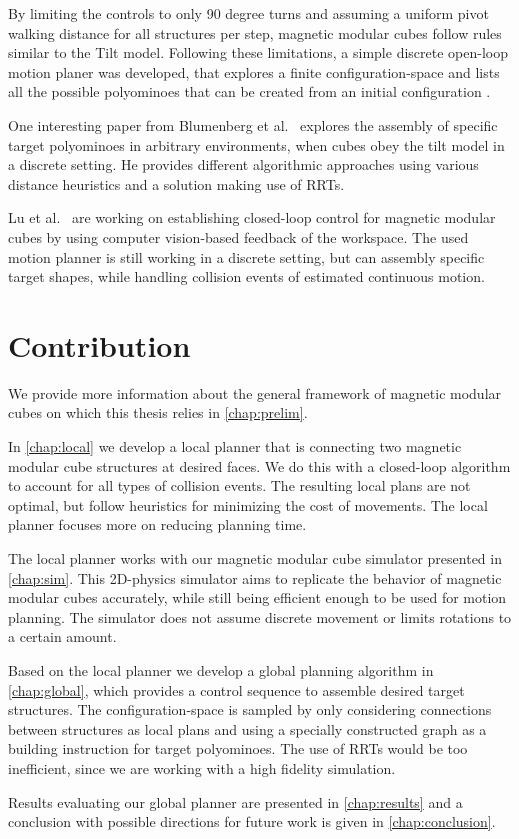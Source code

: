 By limiting the controls to only 90 degree turns and assuming a uniform pivot walking distance for all structures per step, magnetic modular cubes follow rules similar to the Tilt model.
Following these limitations, a simple discrete open-loop motion planer was developed, that explores a finite configuration-space and lists all the possible polyominoes that can be created from an initial configuration \cite{Bhattacharjee2022}.

One interesting paper from Blumenberg et al.\ \cite{blumenberg2023} explores the assembly of specific target polyominoes in arbitrary environments, when cubes obey the tilt model in a discrete setting.
He provides different algorithmic approaches using various distance heuristics and a solution making use of RRTs.

Lu et al.\ \cite{Lu2023} are working on establishing closed-loop control for magnetic modular cubes by using computer vision-based feedback of the workspace.
The used motion planner is still working in a discrete setting, but can assembly specific target shapes, while handling collision events of estimated continuous motion.


\section{Contribution}

We provide more information about the general framework of magnetic modular cubes on which this thesis relies in \autoref{chap:prelim}.

In \autoref{chap:local} we develop a local planner that is connecting two magnetic modular cube structures at desired faces.
We do this with a closed-loop algorithm to account for all types of collision events.
The resulting local plans are not optimal, but follow heuristics for minimizing the cost of movements.
The local planner focuses more on reducing planning time. 

The local planner works with our magnetic modular cube simulator presented in \autoref{chap:sim}.
This 2D-physics simulator aims to replicate the behavior of magnetic modular cubes accurately, while still being efficient enough to be used for motion planning.
The simulator does not assume discrete movement or limits rotations to a certain amount.

Based on the local planner we develop a global planning algorithm in \autoref{chap:global}, which provides a control sequence to assemble desired target structures.
The configuration-space is sampled by only considering connections between structures as local plans and using a specially constructed graph as a building instruction for target polyominoes.
The use of RRTs would be too inefficient, since we are working with a high fidelity simulation. 

Results evaluating our global planner are presented in \autoref{chap:results} and a conclusion with possible directions for future work is given in \autoref{chap:conclusion}.